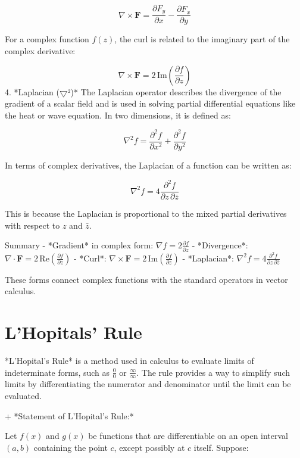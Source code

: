 \documentclass[12pt,a4paper]{article}
\begin{document}
\[
\nabla \times \mathbf{F} = \frac{\partial F_y}{\partial x} - \frac{\partial F_x}{\partial y}
\]

For a complex function \( f(z) \), the curl is related to the imaginary part of the complex derivative:

\[
\nabla \times \mathbf{F} = 2 \, \text{Im} \left( \frac{\partial f}{\partial z} \right)
\]
4. *Laplacian ($\bigtriangledown$²)*
The Laplacian operator describes the divergence of the gradient of a scalar field and is used in solving partial differential equations like the heat or wave equation. In two dimensions, it is defined as:

\[
\nabla^2 f = \frac{\partial^2 f}{\partial x^2} + \frac{\partial^2 f}{\partial y^2}
\]

In terms of complex derivatives, the Laplacian of a function can be written as:

\[
\nabla^2 f = 4 \frac{\partial^2 f}{\partial z \, \partial \bar{z}}
\]

This is because the Laplacian is proportional to the mixed partial derivatives with respect to \( z \) and \( \bar{z} \).

Summary
- *Gradient* in complex form: \( \nabla f = 2 \frac{\partial f}{\partial z} \)
- *Divergence*: \( \nabla \cdot \mathbf{F} = 2 \, \text{Re} \left( \frac{\partial f}{\partial z} \right) \)
- *Curl*: \( \nabla \times \mathbf{F} = 2 \, \text{Im} \left( \frac{\partial f}{\partial z} \right) \)
- *Laplacian*: \( \nabla^2 f = 4 \frac{\partial^2 f}{\partial z \, \partial \bar{z}} \)

These forms connect complex functions with the standard operators in vector calculus.

\newpage

\section{L'Hopitals' Rule}

*L'Hopital's Rule* is a method used in calculus to evaluate limits of indeterminate forms, such as \( \frac{0}{0} \) or \( \frac{\infty}{\infty} \). The rule provides a way to simplify such limits by differentiating the numerator and denominator until the limit can be evaluated.

+ *Statement of L'Hopital's Rule:*

Let \( f(x) \) and \( g(x) \) be functions that are differentiable on an open interval \( (a, b) \) containing the point \( c \), except possibly at \( c \) itself. Suppose:
\end{document}
